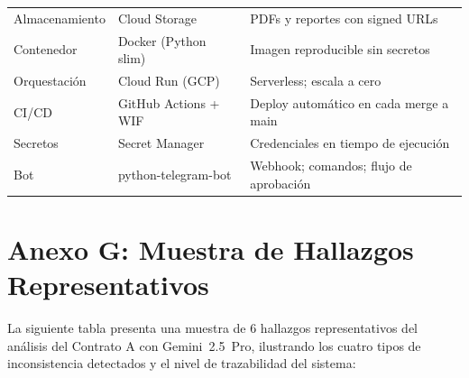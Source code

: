 \begin{longtable}{p{3.2cm} p{3.8cm} p{6.5cm}}
Almacenamiento      & Cloud Storage        & PDFs y reportes con signed URLs \\[6pt]
Contenedor          & Docker (Python slim)  & Imagen reproducible sin secretos \\[6pt]
Orquestación        & Cloud Run (GCP)      & Serverless; escala a cero \\[6pt]
CI/CD               & GitHub Actions + WIF & Deploy automático en cada merge a main \\[6pt]
Secretos            & Secret Manager       & Credenciales en tiempo de ejecución \\[6pt]
Bot                 & python-telegram-bot  & Webhook; comandos; flujo de aprobación \\
\end{longtable}

\section*{Anexo G: Muestra de Hallazgos Representativos}

La siguiente tabla presenta una muestra de 6 hallazgos representativos del
análisis del Contrato A con Gemini~2.5~Pro, ilustrando los cuatro
tipos de inconsistencia detectados y el nivel de trazabilidad del sistema:

